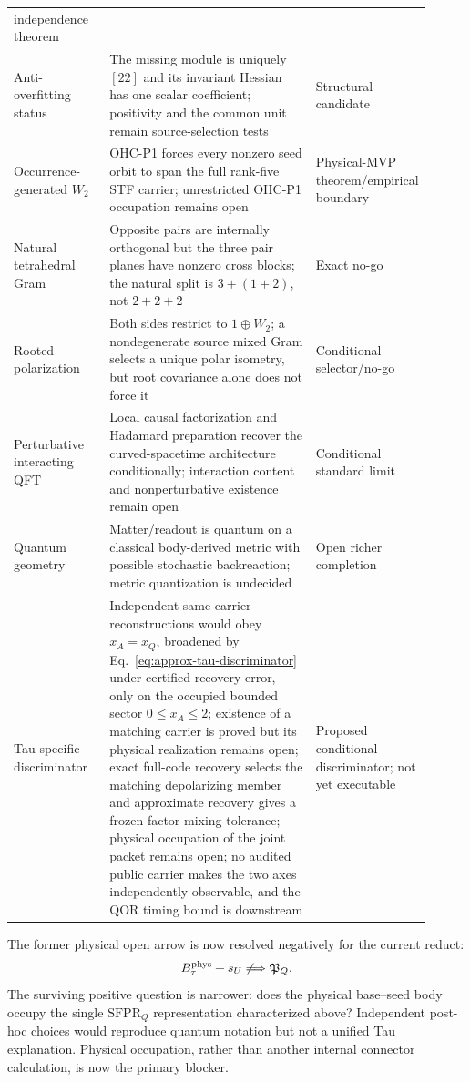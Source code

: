 \documentclass[11pt]{article}
\begin{document}
\begin{longtable}{@{}>{\raggedright\arraybackslash}p{0.23\linewidth}>{\raggedright\arraybackslash}p{0.50\linewidth}>{\raggedright\arraybackslash}p{0.18\linewidth}@{}}
independence theorem \\
Anti-overfitting status & The missing module is uniquely $[22]$ and its
invariant Hessian has one scalar coefficient; positivity and the common unit
remain source-selection tests & Structural candidate \\
Occurrence-generated $W_2$ & OHC-P1 forces every nonzero seed orbit to span
the full rank-five STF carrier; unrestricted OHC-P1 occupation remains open &
Physical-MVP theorem/empirical boundary \\
Natural tetrahedral Gram & Opposite pairs are internally orthogonal but the
three pair planes have nonzero cross blocks; the natural split is
$3+(1+2)$, not $2+2+2$ & Exact no-go \\
Rooted polarization & Both sides restrict to $1\oplus W_2$; a nondegenerate
source mixed Gram selects a unique polar isometry, but root covariance alone
does not force it & Conditional selector/no-go \\
Perturbative interacting QFT & Local causal factorization and Hadamard
preparation recover the curved-spacetime architecture conditionally;
interaction content and nonperturbative existence remain open & Conditional
standard limit \\
Quantum geometry & Matter/readout is quantum on a classical body-derived
metric with possible stochastic backreaction; metric quantization is
undecided & Open richer completion \\
Tau-specific discriminator & Independent same-carrier reconstructions would obey
$x_A=x_Q$, broadened by Eq.~\eqref{eq:approx-tau-discriminator} under certified
recovery error, only on the occupied bounded sector $0\leq x_A\leq2$;
existence of a matching carrier is proved but its physical realization remains
open; exact full-code recovery selects the matching depolarizing member and
approximate recovery gives a frozen factor-mixing tolerance; physical
occupation of the joint packet remains open; no audited public carrier makes
the two axes independently observable, and the QOR timing bound is downstream
& Proposed conditional discriminator; not yet executable \\
\end{longtable}
\fussy
\endgroup

The former physical open arrow is now resolved negatively for the current
reduct:
\begin{equation}
 B_\tau^{\rm phys}+s_U
 \not\Longrightarrow
 \mathfrak P_Q.
 \label{eq:openarrow}
\end{equation}
The surviving positive question is narrower: does the physical base--seed
body occupy the single $\mathrm{SFPR}_Q$ representation characterized above?
Independent post-hoc choices would reproduce quantum notation but not a
unified Tau explanation. Physical occupation, rather than another internal
connector calculation, is now the primary blocker.
\end{document}
